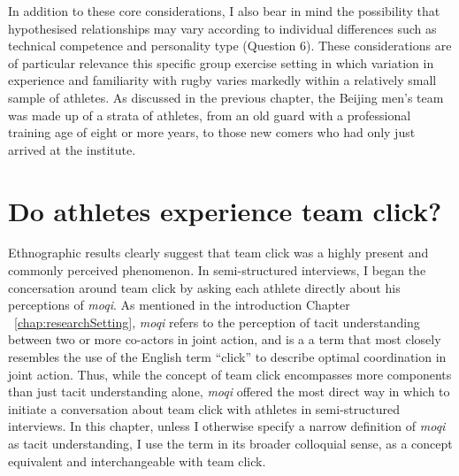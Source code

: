 \begin{CJK}{UTF8}{gbsn}
In addition to these core considerations, I also bear in mind the possibility that hypothesised relationships may vary according to individual differences such as technical competence and personality type (Question 6).  These considerations are of particular relevance this specific group exercise setting in which variation in experience and familiarity with rugby varies markedly within a relatively small sample of athletes. As discussed in the previous chapter, the Beijing men's team was made up of a strata of athletes, from an old guard with a professional training age of eight or more years, to those new comers who had only just arrived at the institute.







\section{Do athletes experience team click?}


Ethnographic results clearly suggest that team click was a highly present and commonly perceived phenomenon.   In semi-structured interviews, I began the concersation around team click by asking each athlete directly about his perceptions of \textit{moqi}.  As mentioned in the introduction Chapter ~\ref{chap:researchSetting}, \textit{moqi} refers to the perception of tacit understanding between two or more co-actors in joint action, and is a a term that most closely resembles the use of the English term ``click'' to describe optimal coordination in joint action.  Thus, while the concept of team click encompasses more components than just tacit understanding alone, \textit{moqi} offered the most direct way in which to initiate a conversation about team click with athletes in semi-structured interviews.  In this chapter, unless I otherwise specify a narrow definition of \textit{moqi} as tacit understanding, I use the term in its broader colloquial sense, as a concept equivalent and interchangeable with team click.


\end{CJK}
